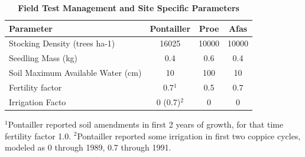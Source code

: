 \documentclass[10pt]{article}
\begin{document}
\begin{table}%
\caption{
\textbf{Field Test Management and Site Specific Parameters}}
\begin{tabular}{|l|c|c|c|}
\hline
Parameter & Pontailler & Proe & Afas \\
\hline
Stocking Density (trees ha-1) & 16025 & 10000 & 10000 \\
Seedling Mass (kg) &  0.4 &  0.6 & 0.4 \\
Soil Maximum Available Water (cm) & 10 & 100 & 10 \\
Fertility factor & 0.7$^1$ & 0.5 & 0.7 \\
Irrigation Facto & 0 (0.7)$^2$ & 0 & 0 \\
\hline
\end{tabular}
\begin{flushleft}$^1$Pontailler reported soil amendments in first 2 years of growth, for that time fertility factor 1.0.  $^2$Pontailler reported some irrigation in first two coppice cycles, modeled as 0 through 1989, 0.7 through 1991.
\end{flushleft}
\label{tab:field-test-manage}
 \end{table}

\end{document}
